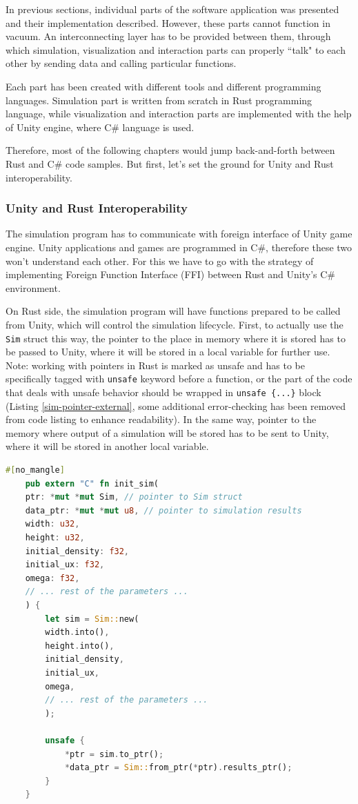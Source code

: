 In previous sections, individual parts of the software application was presented and their implementation described. However, these parts cannot function in vacuum. An interconnecting layer has to be provided between them, through which simulation, visualization and interaction parts can properly ``talk" to each other by sending data and calling particular functions. 

Each part has been created with different tools and different programming languages. Simulation part is written from scratch in Rust programming language, while visualization and interaction parts are implemented with the help of Unity engine, where C\# language is used.

Therefore, most of the following chapters would jump back-and-forth between Rust and C\# code samples. But first, let's set the ground for Unity and Rust interoperability.

\subsubsection{Unity and Rust Interoperability}
The simulation program has to communicate with foreign interface of Unity game engine. Unity applications and games are programmed in C\#, therefore these two won't understand each other. For this we have to go with the strategy of implementing Foreign Function Interface (FFI) between Rust and Unity's C\# environment. 

On Rust side, the simulation program will have functions prepared to be called from Unity, which will control the simulation lifecycle. First, to actually use the \texttt{Sim} struct this way, the pointer to the place in memory where it is stored has to be passed to Unity, where it will be stored in a local variable for further use. Note: working with pointers in Rust is marked as unsafe and has to be specifically tagged with \texttt{unsafe} keyword before a function, or the part of the code that deals with unsafe behavior should be wrapped in \texttt{unsafe \{...\}} block (Listing \ref{sim-pointer-external}, some additional error-checking has been removed from code listing to enhance readability). In the same way, pointer to the memory where output of a simulation will be stored has to be sent to Unity, where it will be stored in another local variable. 

\begin{lstlisting}[language=Rust, caption=The ``external" function \texttt{init\_sim} for instantiating \texttt{Sim} struct by calling the function from external program through FFI., label=sim-pointer-external]
	#[no_mangle]
	pub extern "C" fn init_sim(
	ptr: *mut *mut Sim, // pointer to Sim struct
	data_ptr: *mut *mut u8, // pointer to simulation results
	width: u32,
	height: u32,
	initial_density: f32,
	initial_ux: f32,
	omega: f32,
	// ... rest of the parameters ...
	) {
		let sim = Sim::new(
		width.into(),
		height.into(),
		initial_density,
		initial_ux,
		omega,
		// ... rest of the parameters ...
		);
		
		unsafe {
			*ptr = sim.to_ptr();
			*data_ptr = Sim::from_ptr(*ptr).results_ptr();
		}
	}
\end{lstlisting}

